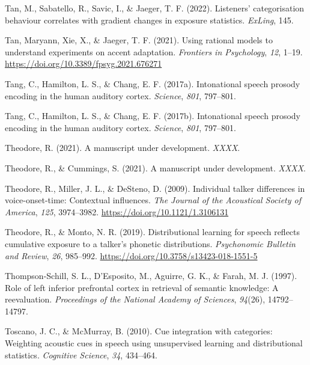 \documentclass[
  11pt,
  english,
  man,floatsintext]{apa6}
\newlength{\cslhangindent}
\newlength{\cslentryspacingunit} %
\newenvironment{CSLReferences}[2] %
 {%
  \setlength{\parindent}{0pt}
  \ifodd #1
  \let\oldpar\par
  \def\par{\hangindent=\cslhangindent\oldpar}
  \fi
  \setlength{\parskip}{#2\cslentryspacingunit}
 }%
 {}
\begin{document}
\begin{CSLReferences}{1}{0}
\leavevmode{}%
Tan, M., Sabatello, R., Savic, I., \& Jaeger, T. F. (2022). Listeners' categorisation behaviour correlates with gradient changes in exposure statistics. \emph{ExLing}, 145.

\leavevmode{}%
Tan, Maryann, Xie, X., \& Jaeger, T. F. (2021). Using rational models to understand experiments on accent adaptation. \emph{Frontiers in Psychology}, \emph{12}, 1--19. \url{https://doi.org/10.3389/fpsyg.2021.676271}

\leavevmode{}%
Tang, C., Hamilton, L. S., \& Chang, E. F. (2017a). Intonational speech prosody encoding in the human auditory cortex. \emph{Science}, \emph{801}, 797--801.

\leavevmode{}%
Tang, C., Hamilton, L. S., \& Chang, E. F. (2017b). Intonational speech prosody encoding in the human auditory cortex. \emph{Science}, \emph{801}, 797--801.

\leavevmode{}%
Theodore, R. (2021). A manuscript under development. \emph{XXXX}.

\leavevmode{}%
Theodore, R., \& Cummings, S. (2021). A manuscript under development. \emph{XXXX}.

\leavevmode{}%
Theodore, R., Miller, J. L., \& DeSteno, D. (2009). Individual talker differences in voice-onset-time: Contextual influences. \emph{The Journal of the Acoustical Society of America}, \emph{125}, 3974--3982. \url{https://doi.org/10.1121/1.3106131}

\leavevmode{}%
Theodore, R., \& Monto, N. R. (2019). Distributional learning for speech reflects cumulative exposure to a talker's phonetic distributions. \emph{Psychonomic Bulletin and Review}, \emph{26}, 985--992. \url{https://doi.org/10.3758/s13423-018-1551-5}

\leavevmode{}%
Thompson-Schill, S. L., D'Esposito, M., Aguirre, G. K., \& Farah, M. J. (1997). Role of left inferior prefrontal cortex in retrieval of semantic knowledge: A reevaluation. \emph{Proceedings of the National Academy of Sciences}, \emph{94}(26), 14792--14797.

\leavevmode{}%
Toscano, J. C., \& McMurray, B. (2010). Cue integration with categories: Weighting acoustic cues in speech using unsupervised learning and distributional statistics. \emph{Cognitive Science}, \emph{34}, 434--464.


\end{CSLReferences}
\end{document}
